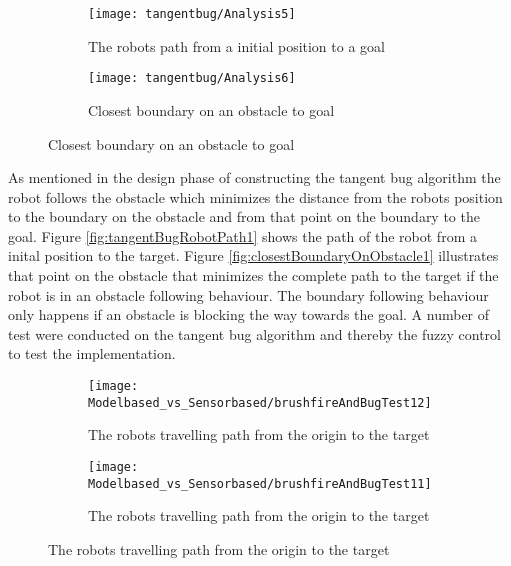 \documentclass[../Head/Main.tex]{subfiles}
\begin{document}
  \begin{figure}[H]
  \begin{subfigure}[b]{0.59\textwidth}
    \centering
    \texttt{[image: tangentbug/Analysis5]}
    \caption{The robots path from a initial position to a goal}
    \label{fig:tangentBugRobotPath3}
  \end{subfigure}
  \hfill
   \begin{subfigure}[b]{0.39\textwidth}
    \centering
    \texttt{[image: tangentbug/Analysis6]}
    \caption{Closest boundary on an obstacle to goal}
    \label{fig:closestBoundaryOnObstacle3}
  \end{subfigure}
\end{figure}
  
As mentioned in the design phase of constructing the tangent bug algorithm the robot follows the obstacle which minimizes the distance from the robots position to the boundary on the obstacle and from that point on the boundary to the goal. Figure \ref{fig:tangentBugRobotPath1} shows the path of the robot from a inital position to the target. Figure \ref{fig:closestBoundaryOnObstacle1} illustrates that point on the obstacle that minimizes the complete path to the target if the robot is in an obstacle following behaviour. The boundary following behaviour only happens if an obstacle is blocking the way towards the goal. A number of test were conducted on the tangent bug algorithm and thereby the fuzzy control to test the implementation.   

\begin{figure}[H]
	\begin{subfigure}[b]{0.49\textwidth}
    	\centering
    	\texttt{[image: Modelbased\_vs\_Sensorbased/brushfireAndBugTest12]}
    	\caption{The robots travelling path from the origin to the target}
    	\label{fig:tangentBugAnalyseTest1}
  	\end{subfigure}
    \hfill
   	\begin{subfigure}[b]{0.49\textwidth}
    	\centering
    	\texttt{[image: Modelbased\_vs\_Sensorbased/brushfireAndBugTest11]}
    	\caption{The robots travelling path from the origin to the target}
    	\label{fig:tangentBugAnalyseTest2}
  	\end{subfigure}
\end{figure}
  
\end{document}
